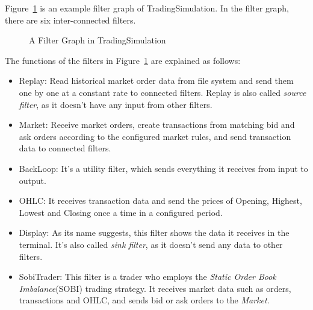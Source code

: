 Figure~\ref{fig-filter-graph} is an example filter graph of TradingSimulation. In the filter graph, there are six inter-connected filters.


\begin{figure}
  \centering
  \centering
  \caption{A Filter Graph in TradingSimulation}
  \label{fig-filter-graph}
\end{figure}

The functions of the filters in Figure~\ref{fig-filter-graph} are explained as follows:

\begin{itemize}
\item{Replay}: Read historical market order data from file system and send them one by one at a constant rate to connected filters. Replay is also called \emph{source filter}, as it doesn't have any input from other filters.
\item{Market}: Receive market orders, create transactions from matching bid and ask orders according to the configured market rules, and send transaction data to connected filters.
\item {BackLoop}: It's a utility filter, which sends everything it receives from input to output.
\item {OHLC}: It receives transaction data and send the prices of Opening, Highest, Lowest and Closing once a time in a configured period.
\item {Display}: As its name suggests, this filter shows the data it receives in the terminal. It's also called \emph{sink filter}, as it doesn't send any data to other filters.
\item {SobiTrader}: This filter is a trader who employs the \emph{Static Order Book Imbalance}(SOBI) trading strategy. It receives market data such as orders, transactions and OHLC, and sends bid or ask orders to the \emph{Market}.
\end{itemize}

